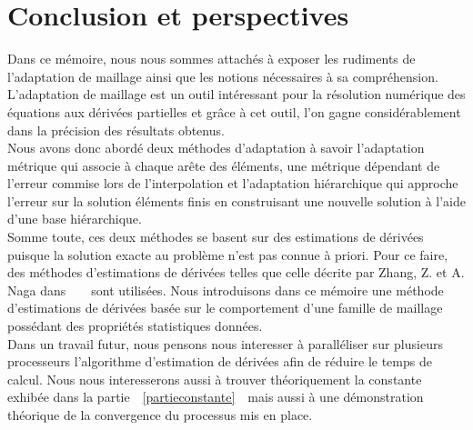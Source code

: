 \chapter*{Conclusion et perspectives}

Dans ce mémoire, nous nous sommes attachés à exposer les rudiments de l'adaptation de maillage ainsi que les notions nécessaires à sa compréhension. L'adaptation de maillage est un outil intéressant pour la résolution numérique des équations aux dérivées partielles et grâce à cet outil, l'on gagne considérablement dans la précision des résultats obtenus.\\

Nous avons donc abordé deux méthodes d'adaptation à savoir l'adaptation métrique qui associe à chaque arête des éléments, une métrique dépendant de l'erreur commise lors de l'interpolation et l'adaptation hiérarchique qui approche l'erreur sur la solution éléments finis en construisant une nouvelle solution à l'aide d'une base hiérarchique.\\
Somme toute, ces deux méthodes se basent sur des estimations de dérivées puisque la solution exacte au problème n'est pas connue à priori. Pour ce faire, des méthodes d'estimations de dérivées telles que celle décrite par  Zhang, Z. et A. Naga dans~~\cite{2}~~sont utilisées. Nous introduisons dans ce mémoire une méthode d'estimations de dérivées basée sur le comportement d'une famille de maillage possédant des propriétés statistiques données.\\

Dans un travail futur, nous pensons nous interesser à paralléliser sur plusieurs processeurs l'algorithme d'estimation de dérivées afin de réduire le temps de calcul. Nous nous interesserons aussi à trouver théoriquement la constante exhibée dans la partie~~\ref{partieconstante}~~mais aussi à une démonstration théorique de la convergence du processus mis en place.